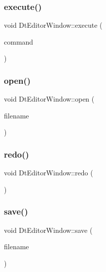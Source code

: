 \subsubsection{\texorpdfstring{execute()}{execute()}}
{\footnotesize\ttfamily void Dt\+Editor\+Window\+::execute (\begin{DoxyParamCaption}\item[{std\+::shared\+\_\+ptr$<$ \mbox{\hyperlink{class_command}{Command}} $>$}]{command }\end{DoxyParamCaption})\hspace{0.3cm}{\ttfamily [protected]}}

\mbox{\label{class_dt_editor_window_afe4694a03730635f386fc4271ddb50f7}} 
\subsubsection{\texorpdfstring{open()}{open()}}
{\footnotesize\ttfamily void Dt\+Editor\+Window\+::open (\begin{DoxyParamCaption}\item[{Q\+String}]{filename }\end{DoxyParamCaption})\hspace{0.3cm}{\ttfamily [protected]}}

\mbox{\label{class_dt_editor_window_a14790e0d43a17db238e7c73690796d28}} 
\subsubsection{\texorpdfstring{redo()}{redo()}}
{\footnotesize\ttfamily void Dt\+Editor\+Window\+::redo (\begin{DoxyParamCaption}{ }\end{DoxyParamCaption})\hspace{0.3cm}{\ttfamily [protected]}}

\mbox{\label{class_dt_editor_window_a5788c87ca0e893c0d60cc866d50b065b}} 
\subsubsection{\texorpdfstring{save()}{save()}}
{\footnotesize\ttfamily void Dt\+Editor\+Window\+::save (\begin{DoxyParamCaption}\item[{Q\+String}]{filename }\end{DoxyParamCaption})\hspace{0.3cm}{\ttfamily [protected]}}

